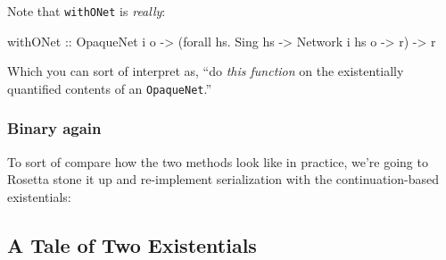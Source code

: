\documentclass[]{article}
\newenvironment{Shaded}{}{}
\newcommand{\KeywordTok}[1]{\textcolor[rgb]{0.00,0.44,0.13}{\textbf{{#1}}}}
\newcommand{\DataTypeTok}[1]{\textcolor[rgb]{0.56,0.13,0.00}{{#1}}}
\newcommand{\CommentTok}[1]{\textcolor[rgb]{0.38,0.63,0.69}{\textit{{#1}}}}
\newcommand{\OtherTok}[1]{\textcolor[rgb]{0.00,0.44,0.13}{{#1}}}
\newcommand{\FunctionTok}[1]{\textcolor[rgb]{0.02,0.16,0.49}{{#1}}}
\newcommand{\NormalTok}[1]{{#1}}
\begin{document}
Note that \texttt{withONet} is \emph{really}:

\begin{Shaded}
\begin{Highlighting}[]
\OtherTok{withONet ::} \DataTypeTok{OpaqueNet} \NormalTok{i o}
         \OtherTok{->} \NormalTok{(forall hs}\FunctionTok{.} \DataTypeTok{Sing} \NormalTok{hs }\OtherTok{->} \DataTypeTok{Network} \NormalTok{i hs o }\OtherTok{->} \NormalTok{r)}
         \OtherTok{->} \NormalTok{r}
\end{Highlighting}
\end{Shaded}

Which you can sort of interpret as, ``do \emph{this function} on the
existentially quantified contents of an \texttt{OpaqueNet}.''

\subsubsection{Binary again}\label{binary-again}

To sort of compare how the two methods look like in practice, we're going to
Rosetta stone it up and re-implement serialization with the continuation-based
existentials:

\begin{Shaded}
\end{Shaded}

\subsection{A Tale of Two Existentials}\label{a-tale-of-two-existentials}
\end{document}
